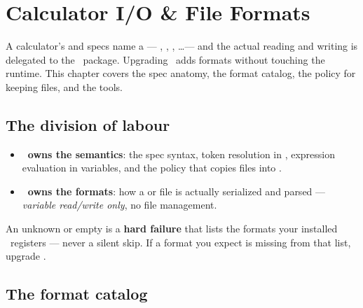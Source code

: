 \chapter{Calculator I/O \& File Formats}
\label{ch:io-types}

 A calculator's  and
 specs name a  --- , , ,
\ldots --- and the actual reading and writing is delegated to the \Portal\ package.
Upgrading \Portal\ adds formats without touching the runtime. This chapter covers the
spec anatomy, the format catalog, the  policy for keeping files, and the
 tools.

\section{The division of labour}
\label{sec:io-ownership}

\begin{itemize}
  \item \textbf{\Jtwo\ owns the semantics}: the spec syntax, token resolution in
        , expression evaluation in  variables, and the
         policy that copies files into .
  \item \textbf{\Portal\ owns the formats}: how a  or  file is
        actually serialized and parsed --- \emph{variable read/write only}, no file
        management.
\end{itemize}

\begin{jwarn}
An unknown or empty  is a \textbf{hard failure} that lists the formats
your installed \Portal\ registers --- never a silent skip. If a format you expect is
missing from that list, upgrade \Portal.
\end{jwarn}

\section{The format catalog}
\label{sec:format-catalog}

